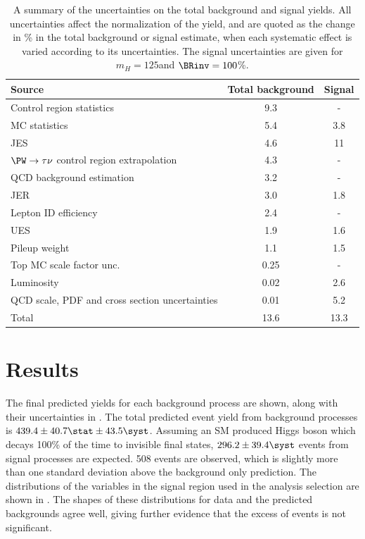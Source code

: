 \begin{table}
  \caption{A summary of the uncertainties on the total background and signal yields. All uncertainties affect the normalization of the yield, and are quoted as the change in \% in the total background or signal estimate, when each systematic effect is varied according to its uncertainties. The signal uncertainties are given for $m_{H}=125$\GeV and $\BRinv=100$\%.}
  \label{tab:parkedsyst}
  \begin{tabular}{lcc}
    \hline \hline
    Source  & Total background & Signal     \\
    \hline
    Control region statistics & 9.3 & - \\
    MC statistics & 5.4 & 3.8 \\
    \ac{JES} & 4.6 & 11 \\
    $\PW\rightarrow\tau\nu$ control region extrapolation & 4.3 & - \\
    QCD background estimation & 3.2 & - \\
    \ac{JER} & 3.0 & 1.8 \\
    Lepton ID efficiency & 2.4 & - \\
    \ac{UES} & 1.9 & 1.6 \\
    Pileup weight & 1.1 & 1.5 \\
    Top MC scale factor unc. & 0.25 & - \\
    Luminosity & 0.02 & 2.6 \\
    QCD scale, PDF and cross section uncertainties & 0.01 & 5.2 \\
    \hline
    Total & 13.6 & 13.3 \\
    \hline \hline
  \end{tabular}
\end{table}




\section{Results}                                                                                                                                        
\label{sec:parkedresults}
The final predicted yields for each background process are shown, along with their uncertainties in . The total predicted event yield from background processes is $439.4\pm 40.7\stat\pm 43.5 \syst$. Assuming an \ac{SM} produced Higgs boson which decays 100\% of the time to invisible final states, $296.2\pm 39.4\syst$ events from signal processes are expected. 508 events are observed, which is slightly more than one standard deviation above the background only prediction. The distributions of the variables in the signal region used in the analysis selection are shown in . The shapes of these distributions for data and the predicted backgrounds agree well, giving further evidence that the excess of events is not significant.


